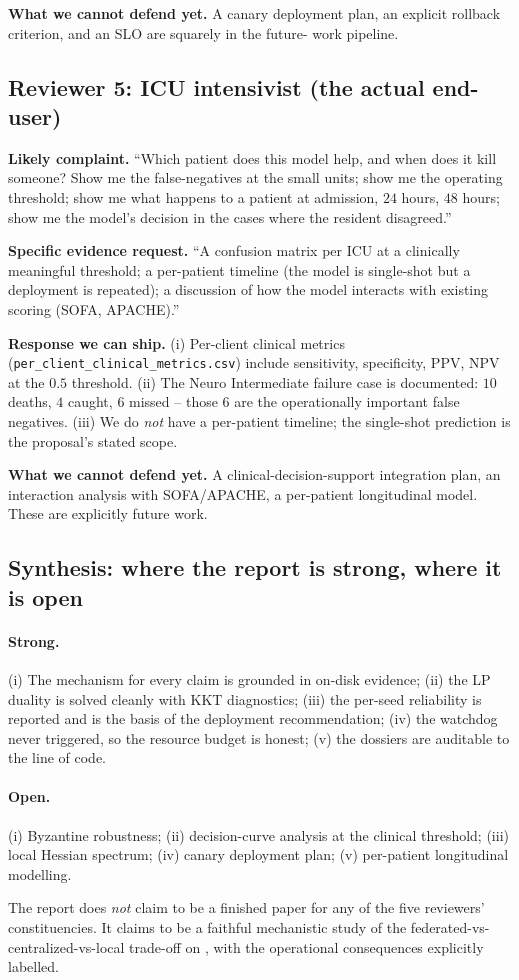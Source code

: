 \textbf{What we cannot defend yet.} A canary deployment plan, an
explicit rollback criterion, and an SLO are squarely in the future-
work pipeline.

\subsection{Reviewer 5: ICU intensivist (the actual end-user)}
\textbf{Likely complaint.} ``Which patient does this model help, and
when does it kill someone? Show me the false-negatives at the small
units; show me the operating threshold; show me what happens to a
patient at admission, $24$ hours, $48$ hours; show me the model's
decision in the cases where the resident disagreed.''

\textbf{Specific evidence request.} ``A confusion matrix per ICU at a
clinically meaningful threshold; a per-patient timeline (the model is
single-shot but a deployment is repeated); a discussion of how the
model interacts with existing scoring (SOFA, APACHE).''

\textbf{Response we can ship.} (i) Per-client clinical metrics
(\texttt{per\_client\_clinical\_metrics.csv}) include sensitivity,
specificity, PPV, NPV at the $0.5$ threshold. (ii) The Neuro
Intermediate failure case is documented: $10$ deaths, $4$ caught,
$6$ missed -- those $6$ are the operationally important false
negatives. (iii) We do \emph{not} have a per-patient timeline; the
single-shot prediction is the proposal's stated scope.

\textbf{What we cannot defend yet.} A clinical-decision-support
integration plan, an interaction analysis with SOFA/APACHE, a
per-patient longitudinal model. These are explicitly future work.

\subsection{Synthesis: where the report is strong, where it is open}
\paragraph{Strong.} (i) The mechanism for every claim is grounded in
on-disk evidence; (ii) the LP duality is solved cleanly with KKT
diagnostics; (iii) the per-seed reliability is reported and is the
basis of the deployment recommendation; (iv) the watchdog never
triggered, so the resource budget is honest; (v) the dossiers are
auditable to the line of code.

\paragraph{Open.} (i) Byzantine robustness; (ii) decision-curve
analysis at the clinical threshold; (iii) local Hessian spectrum;
(iv) canary deployment plan; (v) per-patient longitudinal modelling.

The report does \emph{not} claim to be a finished paper for any of
the five reviewers' constituencies. It claims to be a faithful
mechanistic study of the federated-vs-centralized-vs-local
trade-off on \mimic{}, with the operational consequences explicitly
labelled.
